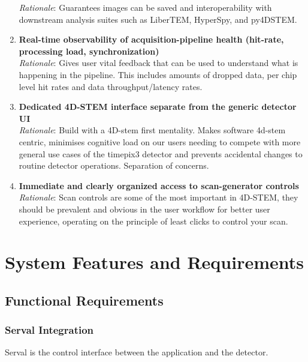 \documentclass[10pt]{article}
\begin{document}
\begin{enumerate}
        \textit{Rationale}: Guarantees images can be saved and interoperability with downstream analysis suites such as LiberTEM, HyperSpy, and py4DSTEM.
        \item \textbf{Real-time observability of acquisition-pipeline health (hit-rate, processing load, synchronization)}\\
        \textit{Rationale}: Gives user vital feedback that can be used to understand what is happening in the pipeline. This includes amounts of dropped data, per chip level hit rates and data throughput/latency rates.
        \item \textbf{Dedicated 4D-STEM interface separate from the generic detector UI}\\
        \textit{Rationale}: Build with a 4D-stem first mentality. Makes software 4d-stem centric, minimises cognitive load on our users needing to compete with more general use cases of the timepix3 detector and prevents accidental changes to routine detector operations. Separation of concerns.
        \item \textbf{Immediate and clearly organized access to scan-generator controls}\\
        \textit{Rationale}: Scan controls are some of the most important in 4D-STEM, they should be prevalent and obvious in the user workflow for better user experience, operating on the principle of least clicks to control your scan.
    \end{enumerate}


    \section{System Features and Requirements}

    \subsection{Functional Requirements}

    \subsubsection{Serval Integration}
    Serval is the control interface between the application and the detector.
\end{document}
